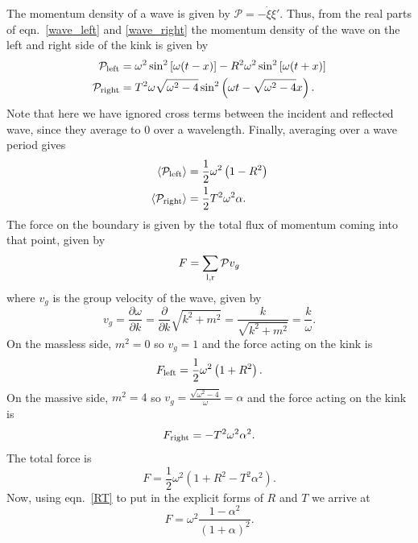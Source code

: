 \documentclass[11pt, oneside,titlepage]{article}  	%
\numberwithin{equation}{section}
\begin{document}
The momentum density of a wave is given by $\mathcal{P} = -\dot{\xi}\xi'$. Thus, from the real parts of eqn.~\ref{wave_left} and \ref{wave_right} the momentum density of the wave on the left and right side of the kink is given by
\begin{align}
\mathcal{P}_\textup{left} &= \omega^2 \sin^2\left[\omega(t-x)\right] - R^2 \omega^2 \sin^2\left[\omega(t+x)\right]\\
\mathcal{P}_\textup{right} &= T^2 \omega \sqrt{\omega^2 - 4} \sin^2\left( \omega t - \sqrt{\omega^2 - 4} x\right ).
\end{align}
Note that here we have ignored cross terms between the incident and reflected wave, since they average to 0 over a wavelength. Finally, averaging over a wave period gives
\begin{align}
 \left \langle \mathcal{P}_\textup{left} \right \rangle &= \frac{1}{2}\omega^2 \left ( 1 - R^2 \right) \\
 \left \langle \mathcal{P}_\textup{right} \right \rangle &= \frac{1}{2}T^2 \omega^2 \alpha.
\end{align}
The force on the boundary is given by the total flux of momentum coming into that point, given by
\begin{equation}
F = \sum_\textup{l,r} \mathcal{P} v_g
\end{equation}
where $v_g$ is the group velocity of the wave, given by
\begin{equation}
v_g = \frac{\partial \omega}{\partial k} = \frac{\partial }{\partial k} \sqrt{k^2+m^2} = \frac{k}{\sqrt{k^2+m^2}} = \frac{k}{\omega}.
\end{equation}
On the massless side, $m^2 = 0$ so $v_g = 1$ and the force acting on the kink is
\begin{equation}
F_\textup{left} = \frac{1}{2}\omega^2 \left ( 1 + R^2 \right).
\end{equation}
On the massive side, $m^2 = 4$ so $v_g = \frac{\sqrt{\omega^2 - 4}}{\omega} = \alpha$ and the force acting on the kink is
\begin{equation}
F_\textup{right} = -T^2 \omega^2 \alpha^2.
\end{equation}
The total force is
\begin{equation}
F = \frac{1}{2}\omega^2 \left ( 1 + R^2-T^2\alpha^2\right).
\end{equation}
Now, using eqn.~\ref{RT} to put in the explicit forms of $R$ and $T$ we arrive at
\begin{equation}
F = \omega^2 \frac{1-\alpha^2}{\left (1+\alpha \right ) ^2}.
\end{equation}
\end{document}

